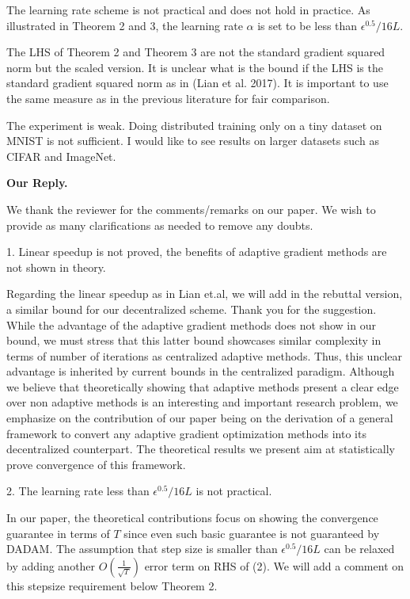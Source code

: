 \documentclass{article} %
\begin{document}
The learning rate scheme is not practical and does not hold in practice. As illustrated in Theorem 2 and 3, the learning rate $\alpha$ is set to be less than $\epsilon^{0.5}/16L$.

The LHS of Theorem 2 and Theorem 3 are not the standard gradient squared norm but the scaled version. It is unclear what is the bound if the LHS is the standard gradient squared norm as in (Lian et al. 2017). It is important to use the same measure as in the previous literature for fair comparison.

The experiment is weak. Doing distributed training only on a tiny dataset on MNIST is not sufficient. I would like to see results on larger datasets such as CIFAR and ImageNet.

\textbf{Our Reply.}

We thank the reviewer for the comments/remarks on our paper.
We wish to provide as many clarifications as needed to remove any doubts.

1. Linear speedup is not proved, the benefits of adaptive gradient methods are not shown in theory.

Regarding the linear speedup as in Lian et.al, we will add in the rebuttal version, a similar bound for our decentralized scheme. Thank you for the suggestion.
While the advantage of the adaptive gradient methods does not show in our bound, we must stress that this latter bound showcases similar complexity in terms of number of iterations as centralized adaptive methods. 
Thus, this unclear advantage is inherited by current bounds in the centralized paradigm.
Although we believe that theoretically showing that adaptive methods present a clear edge over non adaptive methods is an interesting and important research problem, we emphasize on the contribution of our paper being on the derivation of a general framework to convert any adaptive gradient optimization methods into its decentralized counterpart.
The theoretical results we present aim at statistically prove convergence of this framework.

2. The learning rate less than $\epsilon^{0.5}/16L$ is not practical. 

In our paper, the theoretical contributions focus on showing the convergence guarantee in terms of $T$ since even such basic guarantee is not guaranteed by DADAM. 
The assumption that step size is smaller than $\epsilon^{0.5}/16L$ can be relaxed by adding another $O(\frac{1}{\sqrt{T}})$ error term on RHS of (2). We will add a comment on this stepsize requirement below Theorem 2.
\end{document}
